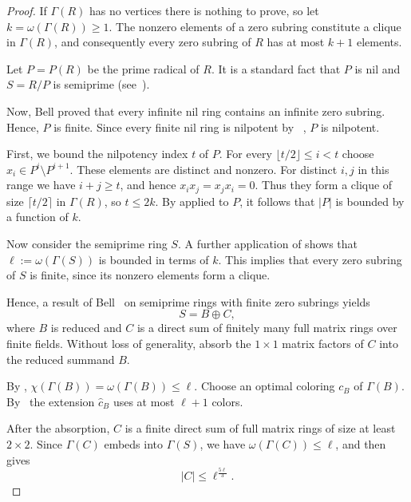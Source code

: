 \documentclass[a4paper,11pt]{amsart}
\theoremstyle{definition}
\begin{document}
\ringchibounded* 
\begin{proof}
If $\Gamma(R)$ has no vertices there is nothing to prove, so let
$k=\omega(\Gamma(R))\ge1$. The nonzero elements of a zero subring constitute a
clique in $\Gamma(R)$, and consequently every zero subring of $R$ has at
most $k+1$ elements.

Let $P=P(R)$ be the prime radical of $R$.
 It is a standard fact that $P$ is nil and $S=R/P$ is semiprime (see~\cite[Section~10]{Lam01}).

Now, Bell proved \cite[Theorem~1]{Bell01} that every infinite nil ring contains an infinite zero subring. Hence, $P$ is finite. Since  every finite nil ring is nilpotent by ~\cite[Corollary~4.13]{Lam01}, $P$ is nilpotent.

First, we bound the nilpotency index $t$ of $P$. For every $\lfloor t/2\rfloor\le i<t$ choose
$x_i\in P^i\setminus P^{i+1}$. These elements are distinct and nonzero. For
distinct $i,j$ in this range we have $i+j\ge t$, and hence
$x_ix_j=x_jx_i=0$. Thus they form a clique of size $\lceil t/2\rceil$ in
$\Gamma(R)$, so $t\le2k$. 
By  applied to $P$, it follows that $|P|$ is bounded by a function of $k$.

Now consider the semiprime ring $S$. A further
application of  shows that
$\ell:=\omega(\Gamma(S))$ is bounded in terms of $k$. This implies that every zero subring of
$S$ is finite, since its nonzero elements form a clique. 

Hence, a result of Bell~\cite[Theorem~2]{Bell01} on 
semiprime rings with finite zero subrings yields
\begin{equation}\label{eq:bell-decomposition}
    S=B\oplus C,
\end{equation}
where $B$ is reduced and $C$ is a direct sum of finitely many full matrix rings over finite fields. 
Without loss of generality, absorb the $1\times1$ matrix factors of $C$ into the reduced summand $B$.

By ,
$\chi(\Gamma(B))=\omega(\Gamma(B))\le\ell$. Choose an optimal coloring
$c_B$ of $\Gamma(B)$. By~ the extension $\widehat c_B$ uses at
most $\ell+1$ colors.

After the absorption, $C$ is a finite direct sum of full matrix rings of size at least
$2\times2$. Since $\Gamma(C)$ embeds into $\Gamma(S)$, we have
$\omega(\Gamma(C))\le\ell$, and  then gives
\[
    |C|\le \ell^{\frac{5\ell}{3}}.
\]


\end{proof}
\end{document}
